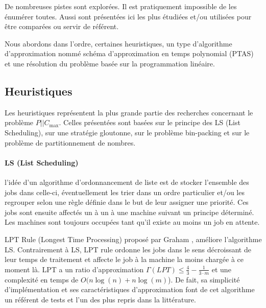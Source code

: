 \documentclass[a4paper,12pt]{report}
\theoremstyle{plain}				%
\theoremstyle{definition}				%
\newcommand\problemGrahamP{$P||C_{\max}$\xspace}
\newcommand{\lp}[1]{\todo[author=LP,color=yellow,inline]{#1}}
\begin{document}
  \lp{Pour la suite préciser: ``Pour P||Cmax'' ?}
De nombreuses pistes sont explorées. Il est pratiquement impossible de les énumérer toutes. 
Aussi sont présentées ici les plus étudiées et/ou utilisées pour être comparées ou servir de référent.
  
Nous abordons dans l'ordre, certaines heuristiques, un type d'algorithme d'approximation nommé schéma d'approximation en temps polynomial (PTAS) et une résolution du problème basée sur la programmation linéaire.

\subsection{Heuristiques}\label{ssec:Heuristiques}

Les heuristiques représentent la plus grande partie des recherches concernant le problème \problemGrahamP. 
Celles présentées sont basées 
  sur le principe des LS (List Scheduling), 
  sur une stratégie gloutonne,   
  sur le problème bin-packing et  
  sur le problème de partitionnement de nombres. 

\bigskip   
\paragraph{LS (List Scheduling)}
l'idée d'un algorithme d'ordonnancement de liste est de stocker l'ensemble des jobs dans celle-ci, éventuellement les trier dans un ordre particulier et/ou les regrouper selon une règle définie dans le but de leur assigner une priorité. Ces jobs sont ensuite affectés un à un à une machine suivant un principe déterminé. 
Les machines sont toujours occupées tant qu'il existe au moins un job en attente.


LPT Rule (Longest Time Processing) %
  proposé par Graham \cite{graham1966bounds}, 
  améliore l'algorithme LS. Contrairement à LS, LPT rule ordonne les jobs dans le sens 
  décroissant de leur temps de traitement et 
  affecte le job à la machine la moins chargée à ce moment là. 
LPT a 
  un ratio d'approximation $\Gamma(LPT) \leq \frac{4}{3}-\frac{1}{3 \cdot m}$ et 
  une complexité en temps de $ O(n \log(n) + n \log(m)$).
De fait, sa simplicité d'implémentation et ses caractéristiques d'approximation font 
  de cet algorithme un référent de tests et l'un des plus repris dans la littérature.
  
\end{document}
